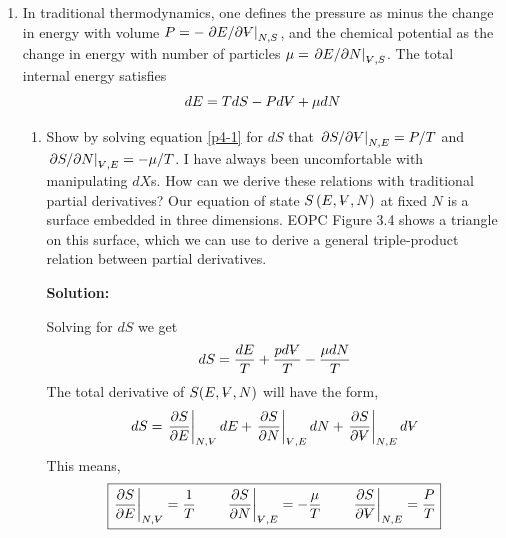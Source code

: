 \documentclass[10pt]{article}
\newenvironment{Solution}
    {\textbf{Solution:}
    
    \vspace{5mm}
    \begin{tcolorbox}
    }
    {
    \end{tcolorbox}
    \vspace{5mm}
    }
\newcommand{\vol}{{\ooalign{\hfil$V$\hfil\cr\kern0.08em--\hfil\cr}}}
\begin{document}
\begin{enumerate}
\begin{enumerate}
\begin{Solution}
    \end{Solution}

\end{enumerate}
\newpage 

\item In traditional thermodynamics, one defines the pressure as minus the change in energy with volume $P = -\left.{ \partial E /\partial\vol  }\right|_{N,S}$, and the chemical potential as the change in energy with number of particles $\mu = \left.\partial E/\partial N \right|_{\scriptsize{\vol}, S}$. The total internal energy satisfies
\begin{equation}\label{p4-1}
    dE = T d S - P d\vol +\mu dN
\end{equation}
\begin{enumerate}
    \item \label{3.10a} Show by solving equation \ref{p4-1} for $dS$ that $ \left.\partial S/\partial \vol \right|_{N, E} = P/T$ and $ \left.\partial S/\partial N \right|_{\scriptsize{\vol}, E} = -\mu/T$. I have always been uncomfortable with manipulating $dX$s. How can we derive these relations with traditional partial derivatives? Our equation of state $S\left(E, \vol, N \right)$ at fixed $N$ is a surface embedded in three dimensions. EOPC Figure 3.4 shows a triangle on this surface, which we can use to derive a general triple-product relation between partial derivatives.
    
    
    \begin{Solution}

    Solving for $dS$ we get
    \begin{equation}
     dS = \frac{dE}{T} + \frac{p d\vol}{T} -\frac{\mu dN}{T} 
    \end{equation}
    The total derivative of $S(E,\vol,N)$ will have the form,
    \begin{equation}
         dS = \left.\frac{\partial S}{\partial E} \right|_{N, \scriptsize{\vol}}  dE + \left.\frac{\partial S}{\partial N} \right|_{\scriptsize{\vol}, E} dN + \left.\frac{\partial S}{\partial \vol} \right|_{N, E} d\vol
    \end{equation}
    This means, 
    \begin{equation}
    \boxed{
         \left.\frac{\partial S}{\partial E} \right|_{N, \scriptsize{\vol}} = \frac{1}{T} 
         \qquad  \left.\frac{\partial S}{\partial N} \right|_{\scriptsize{\vol}, E} = -\frac{\mu}{T}
         \qquad  \left.\frac{\partial S}{\partial \vol} \right|_{N, E} = \frac{P}{T}
         }
    \end{equation}
    \end{Solution}
    \newpage 
    

\end{enumerate}
\end{enumerate}
\end{document}
